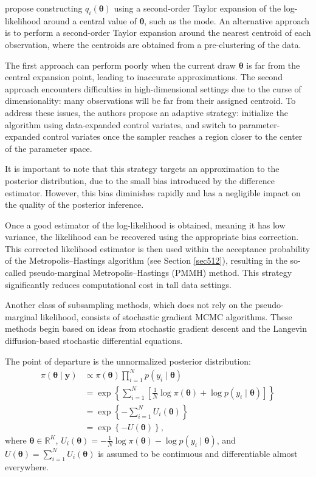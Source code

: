 \cite{quiroz2019speeding} propose constructing \( q_i(\boldsymbol{\theta}) \) using a second-order Taylor expansion of the log-likelihood around a central value of \( \boldsymbol{\theta} \), such as the mode. An alternative approach is to perform a second-order Taylor expansion around the nearest centroid of each observation, where the centroids are obtained from a pre-clustering of the data.

The first approach can perform poorly when the current draw \( \boldsymbol{\theta} \) is far from the central expansion point, leading to inaccurate approximations. The second approach encounters difficulties in high-dimensional settings due to the curse of dimensionality: many observations will be far from their assigned centroid. To address these issues, the authors propose an adaptive strategy: initialize the algorithm using data-expanded control variates, and switch to parameter-expanded control variates once the sampler reaches a region closer to the center of the parameter space.

It is important to note that this strategy targets an approximation to the posterior distribution, due to the small bias introduced by the difference estimator. However, this bias diminishes rapidly and has a negligible impact on the quality of the posterior inference.

Once a good estimator of the log-likelihood is obtained, meaning it has low variance, the likelihood can be recovered using the appropriate bias correction. This corrected likelihood estimator is then used within the acceptance probability of the Metropolis–Hastings algorithm (see Section \ref{sec512}), resulting in the so-called pseudo-marginal Metropolis–Hastings (PMMH) method. This strategy significantly reduces computational cost in tall data settings.

Another class of subsampling methods, which does not rely on the pseudo-marginal likelihood, consists of stochastic gradient MCMC algorithms. These methods begin based on ideas from stochastic gradient descent \cite{robbins1951stochastic} and the Langevin diffusion-based stochastic differential equations.

The point of departure is the unnormalized posterior distribution:
\begin{align*}
	\pi(\boldsymbol{\theta} \mid \mathbf{y}) &\propto \pi(\boldsymbol{\theta}) \prod_{i=1}^{N} p(y_i \mid \boldsymbol{\theta}) \\
	&= \exp\left\{ \sum_{i=1}^N \left[ \frac{1}{N} \log \pi(\boldsymbol{\theta}) + \log p(y_i \mid \boldsymbol{\theta}) \right] \right\} \\
	&= \exp\left\{ -\sum_{i=1}^N U_i(\boldsymbol{\theta}) \right\} \\
	&= \exp\left\{ -U(\boldsymbol{\theta}) \right\},
\end{align*}
where \( \boldsymbol{\theta} \in \mathbb{R}^K \), \( U_i(\boldsymbol{\theta}) = -\frac{1}{N} \log \pi(\boldsymbol{\theta}) - \log p(y_i \mid \boldsymbol{\theta}) \), and \( U(\boldsymbol{\theta}) = \sum_{i=1}^N U_i(\boldsymbol{\theta}) \) is assumed to be continuous and differentiable almost everywhere.  

